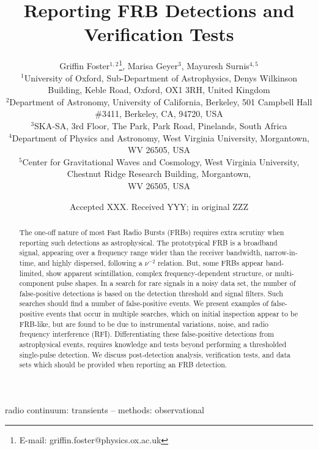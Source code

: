 \documentclass[a4paper,fleqn,usenatbib]{mnras}
\title[FRB Detections and Verification Tests]{Reporting FRB Detections
and Verification Tests}
\author[G. Foster et al.]{
Griffin Foster$^{1,2}$\thanks{E-mail: griffin.foster@physics.ox.ac.uk},
Marisa Geyer$^{3}$,
Mayuresh Surnis$^{4,5}$
\\
$^{1}$University of Oxford, Sub-Department of Astrophysics, Denys Wilkinson Building, Keble Road, Oxford, OX1 3RH, United Kingdom\\
$^{2}$Department of Astronomy, University of California, Berkeley, 501 Campbell
Hall \#3411, Berkeley, CA, 94720, USA\\
$^{3}$SKA-SA, 3rd Floor, The Park, Park Road, Pinelands, South Africa\\
$^{4}$Department of Physics and Astronomy, West Virginia University, Morgantown, WV 26505, USA\\
$^{5}$Center for Gravitational Waves and Cosmology, West Virginia University, Chestnut Ridge Research Building, Morgantown,\\ WV 26505, USA\\
}
\date{Accepted XXX. Received YYY; in original ZZZ}
\begin{document}
\label{firstpage}
\pagerange{\pageref{firstpage}--\pageref{lastpage}}
\maketitle


\begin{abstract}
The one-off nature of most Fast Radio Bursts (FRBs) requires extra scrutiny when
reporting such detections as astrophysical.  The prototypical FRB is a broadband
signal, appearing over a frequency range wider than the receiver bandwidth,
narrow-in-time, and highly dispersed, following a $\nu^{-2}$ relation.  But,
some FRBs appear band-limited, show apparent scintillation, complex
frequency-dependent structure, or multi-component pulse shapes.  In a search for
rare signals in a noisy data set, the number of false-positive detections is
based on the detection threshold and signal filters.  Such searches should find
a number of false-positive events.  We present examples of false-positive events
that occur in multiple searches, which on initial inspection appear to be
FRB-like, but are found to be due to instrumental variations, noise, and radio
frequency interference (RFI).  Differentiating these false-positive detections
from astrophysical events, requires knowledge and tests beyond performing a
thresholded single-pulse detection.  We discuss post-detection analysis,
verification tests, and data sets which should be provided when reporting an FRB
detection.
\end{abstract}

\begin{keywords}
radio continuum: transients -- methods: observational
\end{keywords}

\end{document}
